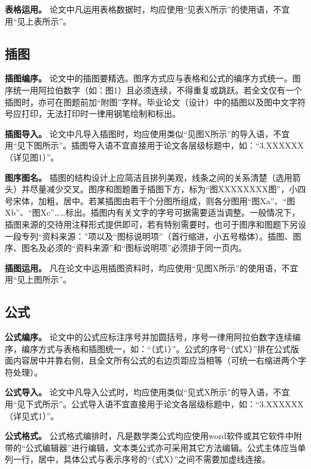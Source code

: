 \documentclass[doublesided]{Style/ucasthesis}%
\begin{document}
\textbf{表格运用。} 论文中凡运用表格数据时，均应使用``见表X所示''的使用语，不宜用``见上表所示''。

\hypertarget{section-29}{%
\subsection{插图}\label{section-29}}

\textbf{插图编序。} 论文中的插图要精选。图序方式应与表格和公式的编序方式统一。图序统一用阿拉伯数字（如：图1）且必须连续，不得重复或跳跃。若全文仅有一个插图时，亦可在图题前加``附图''字样。毕业论文（设计）中的插图以及图中文字符号应打印，无法打印时一律用钢笔绘制和标出。

\textbf{插图导入。} 论文中凡导入插图时，均应使用类似``见图X所示''的导入语，不宜用``见下图所示''。插图导入语不宜直接用于论文各层级标题中，如：``3.XXXXXX（详见图1）''。

\textbf{图序图名。} 插图的结构设计上应简洁且排列美观，线条之间的关系清楚（选用箭头）并尽量减少交叉。图序和图题置于插图下方，标为``图XXXXXXXX图''，小四号宋体，加粗，居中。若某插图由若干个分图所组成，则各分图用``图Xa''、``图Xb''、``图Xc''\ldots{}\ldots{}标出。插图内有关文字的字号可据需要适当调整。一般情况下，插图来源的交待用注释形式提供即可，若有特别需要时，也可于图序和图题下另设一段专列``资料来源：''项以及``图标说明项''（首行缩进，小五号楷体）。插图、图序、图名及必须的``资料来源''和``图标说明项''必须排于同一页内。

\textbf{插图运用。} 凡在论文中运用插图资料时，均应使用``见图X所示''的使用语，不宜用``见上图所示''。

\hypertarget{section-30}{%
\subsection{公式}\label{section-30}}

\textbf{公式编序。} 论文中的公式应标注序号并加圆括号，序号一律用阿拉伯数字连续编序，编序方式与表格和插图统一，如：``（式1）''。公式的序号``（式X）''排在公式版面内容居中并靠右侧，且全文所有公式的右边页距应当相等（可统一右缩进两个字符处理）。

\textbf{公式导入。} 论文中凡导入公式时，均应使用类似``见式X所示''的导入语，不宜用``见下式所示''。公式导入语不宜直接用于论文各层级标题中，如：``3.XXXXXX（详见式1）''。

\textbf{公式格式。} 公式格式编排时，凡是数学类公式均应使用word软件或其它软件中附带的``公式编辑器''进行编辑，文本类公式亦可采用其它方法编辑。公式主体应当单列一行，居中，具体公式与表示序号的``（式X）''之间不需要加虚线连接。
\end{document}
